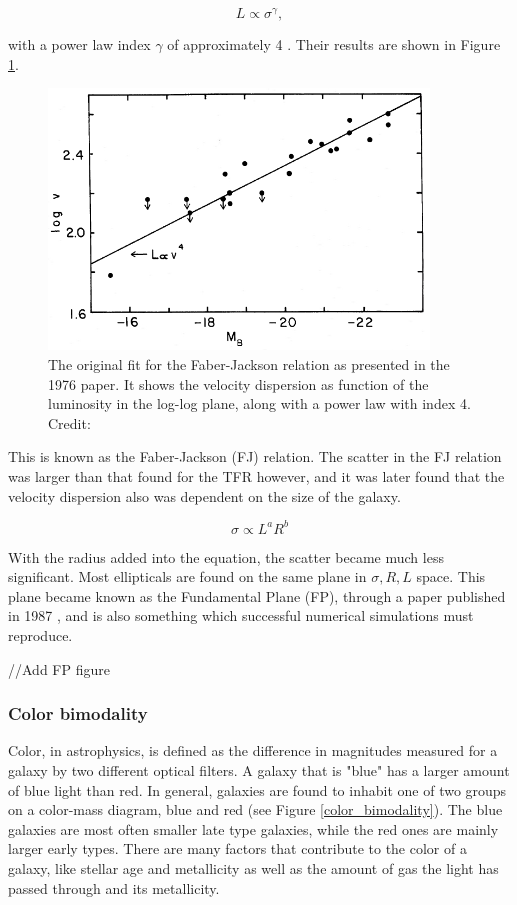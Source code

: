 \begin{equation}
    L \propto \sigma^{\gamma},
\end{equation}

with a power law index $\gamma$ of approximately 4 \parencite{FaberJackson1976}. Their results are shown in Figure \ref{faber_jackson}.

\begin{figure}
    \centering
    \includegraphics[width=0.9\textwidth]{images/faber_jackson.png}
    \caption{The original fit for the Faber-Jackson relation as presented in the 1976 paper. It shows the velocity dispersion as function of the luminosity in the log-log plane, along with a power law with index 4. Credit: \cite{FaberJackson1976}}
    \label{faber_jackson}
\end{figure}

This is known as the Faber-Jackson (FJ) relation. The scatter in the FJ relation was larger than that found for the TFR however, and it was later found that the velocity dispersion also was dependent on the size of the galaxy.

\begin{equation}
    \sigma \propto L^a R^b
\end{equation}

With the radius added into the equation, the scatter became much less significant. Most ellipticals are found on the same plane in ${\sigma, R, L}$ space. This plane became known as the Fundamental Plane (FP), through a paper published in 1987 \parencite{Djorgovski1987}, and is also something which successful numerical simulations must reproduce.

//Add FP figure

\subsubsection{Color bimodality}
Color, in astrophysics, is defined as the difference in magnitudes measured for a galaxy by two different optical filters. A galaxy that is "blue" has a larger amount of blue light than red. In general, galaxies are found to inhabit one of two groups on a color-mass diagram, blue and red (see Figure \ref{color_bimodality}). The blue galaxies are most often smaller late type galaxies, while the red ones are mainly larger early types. There are many factors that contribute to the color of a galaxy, like stellar age and metallicity as well as the amount of gas the light has passed through and its metallicity.

